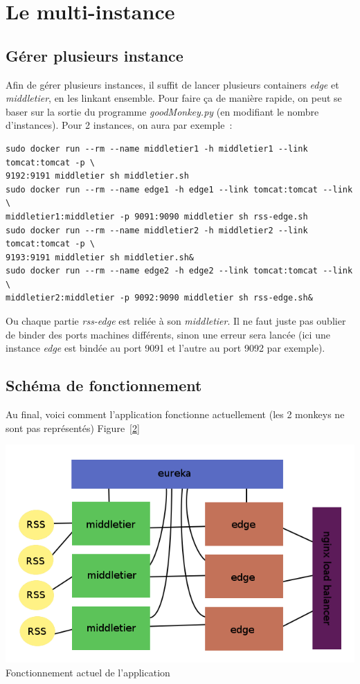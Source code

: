 \documentclass{article}
\begin{document}
	\section{Le multi-instance}
	\subsection{Gérer plusieurs instance}
	Afin de gérer plusieurs instances, il suffit de lancer plusieurs containers \emph{edge} et \emph{middletier}, en les linkant ensemble. Pour faire ça de manière rapide, on peut se baser sur la sortie du programme \emph{goodMonkey.py} (en modifiant le nombre d'instances). Pour 2 instances, on aura par exemple~:
	\begin{verbatim}
sudo docker run --rm --name middletier1 -h middletier1 --link tomcat:tomcat -p \
9192:9191 middletier sh middletier.sh
sudo docker run --rm --name edge1 -h edge1 --link tomcat:tomcat --link \
middletier1:middletier -p 9091:9090 middletier sh rss-edge.sh
sudo docker run --rm --name middletier2 -h middletier2 --link tomcat:tomcat -p \
9193:9191 middletier sh middletier.sh&
sudo docker run --rm --name edge2 -h edge2 --link tomcat:tomcat --link \
middletier2:middletier -p 9092:9090 middletier sh rss-edge.sh&
	\end{verbatim}
	Ou chaque partie \emph{rss-edge} est reliée à son \emph{middletier}. Il ne faut juste pas oublier de binder des ports machines différents, sinon une erreur sera lancée (ici une instance \emph{edge} est bindée au port 9091 et l'autre au port 9092 par exemple).
	\subsection{Schéma de fonctionnement}
	Au final, voici comment l'application fonctionne actuellement (les 2 monkeys ne sont pas représentés) Figure~\ref{2}
	\begin{center}
		\includegraphics[scale=0.5]{actual}\\
		Fonctionnement actuel de l'application
		\label{2}
	\end{center}
\end{document}
